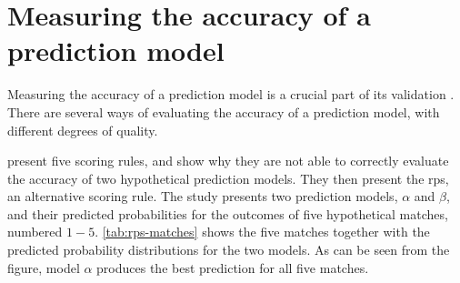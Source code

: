 \section{Measuring the accuracy of a prediction model}
\label{sec:background-rps}

Measuring the accuracy of a prediction model is a crucial part of its validation \citep{bib:constantinou-fenton-neil-2012}. There are several ways of evaluating the accuracy of a prediction model, with different degrees of quality.

\citet{bib:constantinou-fenton-2012} present five scoring rules, and show why they are not able to correctly evaluate the accuracy of two hypothetical prediction models. They then present the \gls{rps}, an alternative scoring rule. The study presents two prediction models, $\alpha$ and $\beta$, and their predicted probabilities for the outcomes of five hypothetical matches, numbered $1-5$. \cref{tab:rps-matches} shows the five matches together with the predicted probability distributions for the two models. As can be seen from the figure, model $\alpha$ produces the best prediction for all five matches.
